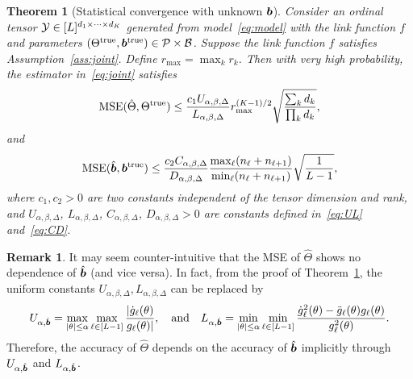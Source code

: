 \documentclass[11pt]{article}
\theoremstyle{plain}
\newtheorem{thm}{Theorem}[section]
\theoremstyle{definition}
\newtheorem{rmk}{Remark}
\begin{document}
\begin{thm}[Statistical convergence with unknown $\bm{b}$]\label{thm:ratejoint}
Consider an ordinal tensor $\mathcal{Y}\in[L]^{d_1\times \cdots \times d_K}$ generated from model~\eqref{eq:model} with the link function $f$ and parameters $(\Theta^{\text{true}}, \bm{b}^{\text{true}})\in\mathcal{P}\times \mathcal{B}$. Suppose the link function $f$ satisfies Assumption~\ref{ass:joint}. Define $r_{\max}=\max_k r_k$. Then with very high probability, the estimator in~\eqref{eq:joint} satisfies
\[
\text{MSE}(\hat \Theta, \Theta^{\text{true}})\leq {c_1U_{\alpha,\beta,\Delta}\over L_{\alpha,\beta,\Delta}} r_{\max}^{(K-1)/2}  \sqrt{ \sum_k d_k \over \prod_k d_k},
\]
and
\[
\text{MSE}(\hat{\bm{b}}, \bm{b}^{\text{true}}) \leq  {c_2 C_{\alpha,\beta,\Delta} \over D_{\alpha,\beta,\Delta}}{\max_{\ell}(n_\ell+n_{\ell+1})\over \min_{\ell}(n_{\ell}+n_{\ell+1})}  \sqrt{1\over L-1},
\]
where $c_1,c_2>0$ are two constants independent of the tensor dimension and rank, and $U_{\alpha,\beta,\Delta}$, $L_{\alpha,\beta,\Delta}$, $C_{\alpha,\beta,\Delta}$, $D_{\alpha,\beta,\Delta}>0$ are constants defined in~\eqref{eq:UL} and~\eqref{eq:CD}.
\end{thm}

\begin{rmk} It may seem counter-intuitive that the MSE of $\hat \Theta$ shows no dependence of $\hat {\bm{b}}$ (and vice versa). In fact, from the proof of Theorem~\ref{thm:ratejoint}, the uniform constants $U_{\alpha,\beta,\Delta}, L_{\alpha,\beta,\Delta}$ can be replaced by
\[
U_{\alpha,\hat {\bm{b}}}=\max_{|\theta|\leq \alpha}\max_{\ell\in[L-1]}{|\dot{g}_\ell(\theta)\over g_\ell(\theta)|},\quad \text{and}\quad L_{\alpha,\hat {\bm{b}}}=\min_{|\theta|\leq \alpha}\min_{\ell\in[L-1]} {\dot{g}^2_\ell(\theta)-\ddot{g}_\ell(\theta)g_\ell(\theta)\over g^2_\ell(\theta)}.
\]
Therefore, the accuracy of $\hat \Theta$ depends on the accuracy of $\hat {\bm{b}}$ implicitly through $U_{\alpha, \hat {\bm{b}}}$ and $ L_{\alpha,\hat {\bm{b}}}$. 

\end{rmk}
\end{document}
